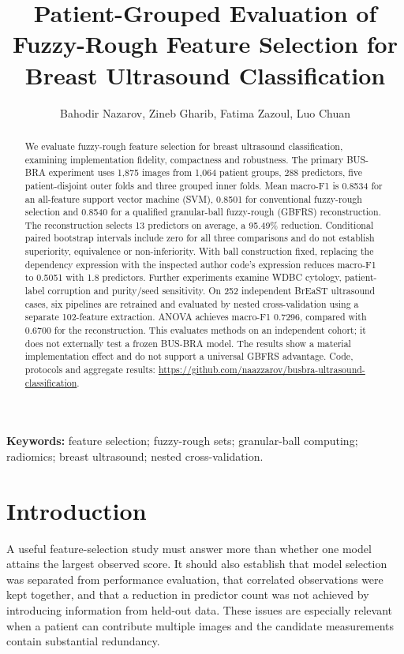 \documentclass[11pt,a4paper]{article}
\title{Patient-Grouped Evaluation of Fuzzy-Rough Feature Selection for Breast Ultrasound Classification}
\author{Bahodir Nazarov, Zineb Gharib, Fatima Zazoul, Luo Chuan}
\date{}
\makeatletter
\renewcommand{\maketitle}{%
  \begingroup
    \centering
    {\fontsize{16}{19}\selectfont\bfseries\@title\par}
    \vspace{0.65em}
    {\normalsize\@author\par}
  \endgroup
  \vspace{0.2em}
}
\makeatother
\begin{document}
\maketitle
\begin{abstract}
We evaluate fuzzy-rough feature selection for breast ultrasound classification, examining implementation fidelity, compactness and robustness. The primary BUS-BRA experiment uses 1,875 images from 1,064 patient groups, 288 predictors, five patient-disjoint outer folds and three grouped inner folds. Mean macro-F1 is 0.8534 for an all-feature support vector machine (SVM), 0.8501 for conventional fuzzy-rough selection and 0.8540 for a qualified granular-ball fuzzy-rough (GBFRS) reconstruction. The reconstruction selects 13 predictors on average, a 95.49\% reduction. Conditional paired bootstrap intervals include zero for all three comparisons and do not establish superiority, equivalence or non-inferiority. With ball construction fixed, replacing the dependency expression with the inspected author code's expression reduces macro-F1 to 0.5051 with 1.8 predictors. Further experiments examine WDBC cytology, patient-label corruption and purity/seed sensitivity. On 252 independent BrEaST ultrasound cases, six pipelines are retrained and evaluated by nested cross-validation using a separate 102-feature extraction. ANOVA achieves macro-F1 0.7296, compared with 0.6700 for the reconstruction. This evaluates methods on an independent cohort; it does not externally test a frozen BUS-BRA model. The results show a material implementation effect and do not support a universal GBFRS advantage. Code, protocols and aggregate results: \url{https://github.com/naazzarov/busbra-ultrasound-classification}.
\end{abstract}
\textbf{Keywords:} feature selection; fuzzy-rough sets; granular-ball computing; radiomics; breast ultrasound; nested cross-validation.

\section{Introduction}
A useful feature-selection study must answer more than whether one model attains the largest observed score. It should also establish that model selection was separated from performance evaluation, that correlated observations were kept together, and that a reduction in predictor count was not achieved by introducing information from held-out data. These issues are especially relevant when a patient can contribute multiple images and the candidate measurements contain substantial redundancy.
\end{document}
